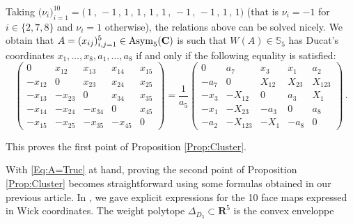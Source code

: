 \documentclass[11pt]{amsart}
\newcommand{\mk}{\medskip}
\begin{document}
Taking  
$\big(\nu_i\big)_{i=1}^{10}=\big( 
\,  1\, , \,  -1\, , \,  1\, , \,  1\, , \,  1\, , \,  1\, , \, -1\, , \,  -1\, , \,  1\, , \,  1
\big)$ (that is $\nu_i=-1$ for $i\in \{2,7,8\}$ and $\nu_i=1$ otherwise), 
the relations above can be solved nicely.  We obtain that 
$A=(x_{ij})_{i,j=1}^5\in {\rm Asym}_5(\mathbf C)$ is such that $W(A)\in \mathbb S_5$ has 
Ducat's coordinates $x_1,\ldots,x_8,a_1,\ldots,a_8$ if and only if the following equality is satisfied: 
\begin{equation}
\label{Eq:A=Truc}
 \begin{pmatrix}
0 &x_{12}  & 
{x_{13}}  & 
{x_{14}}  & {x_{15}}  
\\
 -x_{12}  & 0 & {x_{23}} & 
x_{24}  & 
x_{25}\\
 -{x_{13}}  &  -{x_{23}}  & 0 & {x_{34}}  & {x_{35}}
 \\
 -{x_{14}}   & -{x_{24}}  & -{x_{34}}  & 0 & {x_{45}}  
\\
 -{x_{15}}   & -{x_{25}} & -{x_{35}}  & - {x_{45}}    & 0 
 \end{pmatrix}
=
\frac{1}{a_5} \begin{pmatrix}
0 & {a_7}  & 
{x_3}  & 
{x_1}  & {a_2}  
\\
 -{a_7}  & 0 & {X_{12}} & 
 {X_{23}}  & 
 {X_{123}}\\
 -{x_3}  & -{X_{12}} & 0 & {a_3}  & 
 {X_1}
 \\
 -{x_1}  & -{X_{23}}  & -{a_3}  & 0 & {a_8}  
\\
 -{a_2}  & -{X_{123}} & -{X_1}  & -{a_8}  & 0 
 \end{pmatrix} \, .
\end{equation}

This proves the first point of Proposition \ref{Prop:Cluster}. 
\mk 

With 
\eqref{Eq:A=Truc} at hand, proving the second point of Proposition  \ref{Prop:Cluster} becomes straightforward using some  formulas obtained in our previous article. 
In \cite{PirioAFST}, we gave explicit expressions for the 10 face maps expressed in Wick coordinates.  The weight polytope $\Delta_{D_5}\subset \mathbf R^5$ is the convex enveloppe 
\end{document}
